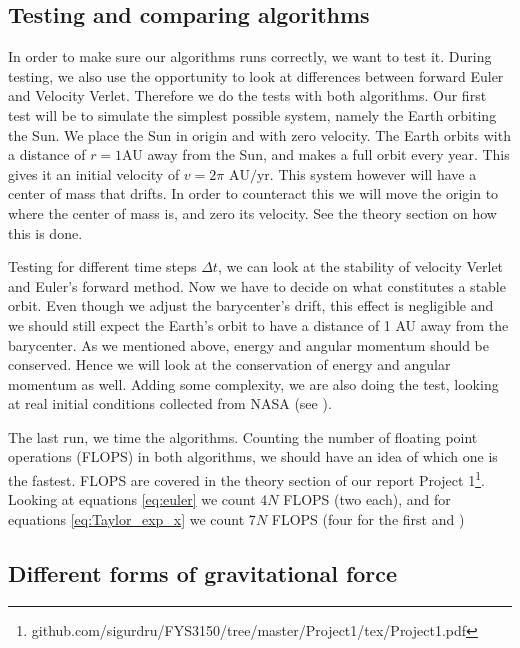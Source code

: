 \documentclass[reprint, english,notitlepage,nofootinbib]{revtex4-1}  %
\begin{document}
\subsection{Testing and comparing algorithms}

In order to make sure our algorithms runs correctly, we want to test it. During testing, we also use the opportunity to look at differences between forward Euler and Velocity Verlet. Therefore we do the tests with both algorithms. Our first test will be to simulate the simplest possible system, namely the Earth orbiting the Sun. We place the Sun in origin and with zero velocity. The Earth orbits with a distance of $r=1$AU away from the Sun, and makes a full orbit every year. This gives it an initial velocity of $v = 2\pi \text{ AU}/\text{yr}.$ This system however will have a center of mass that drifts. In order to counteract this we will move the origin to where the center of mass is, and zero its velocity. See the theory section on how this is done.

Testing for different time steps $\Delta t$, we can look at the stability of velocity Verlet and Euler's forward method. Now we have to decide on what constitutes a stable orbit. Even though we adjust the barycenter's drift, this effect is negligible and we should still expect the Earth's orbit to have a distance of 1 AU away from the barycenter. As we mentioned above, energy and angular momentum should be conserved. Hence we will look at the conservation of energy and angular momentum as well. Adding some complexity, we are also doing the test, looking at real initial conditions collected from NASA (see \citep{NASA}).

The last run, we time the algorithms. Counting the number of floating point operations (FLOPS) in both algorithms, we should have an idea of which one is the fastest. FLOPS are covered in the theory section of our report Project 1\footnote{github.com/sigurdru/FYS3150/tree/master/Project1/tex/Project1.pdf}. Looking at equations \eqref{eq:euler} we count 4$N$ FLOPS (two each), and for equations \eqref{eq:Taylor_exp_x} we count 7$N$ FLOPS (four for the first and )

\subsection{Different forms of gravitational force}
\end{document}
